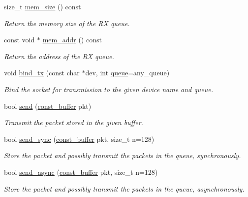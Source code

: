 \begin{DoxyCompactItemize}
size\+\_\+t \hyperlink{classpfq_1_1socket_a1888ae33a42258fdbb2aac1dc3feb55c}{mem\+\_\+size} () const 
\begin{DoxyCompactList}\small\item\em Return the memory size of the R\+X queue. \end{DoxyCompactList}\item 
const void $\ast$ \hyperlink{classpfq_1_1socket_a32275b5b77913fadc7671efdef75369b}{mem\+\_\+addr} () const 
\begin{DoxyCompactList}\small\item\em Return the address of the R\+X queue. \end{DoxyCompactList}\item 
void \hyperlink{classpfq_1_1socket_a986a4bb8c7b23fd73ce1e8f340a3fb67}{bind\+\_\+tx} (const char $\ast$dev, int \hyperlink{classpfq_1_1queue}{queue}=any\+\_\+queue)
\begin{DoxyCompactList}\small\item\em Bind the socket for transmission to the given device name and queue. \end{DoxyCompactList}\item 
bool \hyperlink{classpfq_1_1socket_ab0b61a0a5741e24aa7cfbf090e2dc776}{send} (\hyperlink{namespacepfq_ac835a1bd09b4cbaba61c100b50d0a99f}{const\+\_\+buffer} pkt)
\begin{DoxyCompactList}\small\item\em Transmit the packet stored in the given buffer. \end{DoxyCompactList}\item 
bool \hyperlink{classpfq_1_1socket_a73acb3e9a0ee657255385c32ef53334e}{send\+\_\+sync} (\hyperlink{namespacepfq_ac835a1bd09b4cbaba61c100b50d0a99f}{const\+\_\+buffer} pkt, size\+\_\+t n=128)
\begin{DoxyCompactList}\small\item\em Store the packet and possibly transmit the packets in the queue, synchronously. \end{DoxyCompactList}\item 
bool \hyperlink{classpfq_1_1socket_a7def045b0472dc611c95c80f512c6e7e}{send\+\_\+async} (\hyperlink{namespacepfq_ac835a1bd09b4cbaba61c100b50d0a99f}{const\+\_\+buffer} pkt, size\+\_\+t n=128)
\begin{DoxyCompactList}\small\item\em Store the packet and possibly transmit the packets in the queue, asynchronously. \end{DoxyCompactList}\item 

\end{DoxyCompactItemize}
